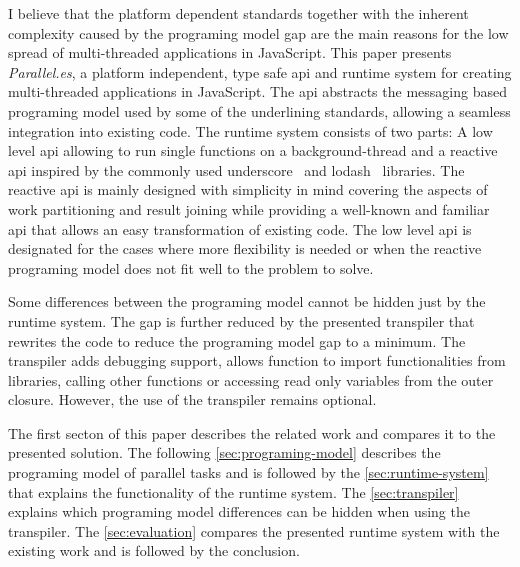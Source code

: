 I believe that the platform dependent standards together with the inherent complexity caused by the programing model gap are the main reasons for the low spread of multi-threaded applications in JavaScript. This paper presents \textit{Parallel.es}, a platform independent, type safe api and runtime system for creating multi-threaded applications in JavaScript. The api abstracts the messaging based programing model used by some of the underlining standards, allowing a seamless integration into existing code. The runtime system consists of two parts: A low level api allowing to run single functions on a background-thread and a reactive api inspired by the commonly used underscore~\cite{underscorejs} and lodash~\cite{lodash} libraries. The reactive api is mainly designed with simplicity in mind covering the aspects of work partitioning and result joining while providing a well-known and familiar api that allows an easy transformation of existing code. The low level api is designated for the cases where more flexibility is needed or when the reactive programing model does not fit well to the problem to solve. 

Some differences between the programing model cannot be hidden just by the runtime system. The gap is further reduced by the presented transpiler that rewrites the code to reduce the programing model gap to a minimum. The transpiler adds debugging support, allows function to import functionalities from libraries, calling other functions or accessing read only variables from the outer closure. However, the use of the transpiler remains optional. 


The first secton of this paper describes the related work and compares it to the presented solution. The following \cref{sec:programing-model} describes the programing model of parallel tasks and is followed by the \cref{sec:runtime-system} that explains the functionality of the runtime system. The \cref{sec:transpiler} explains which programing model differences can be hidden when using the transpiler. The \cref{sec:evaluation} compares the presented runtime system with the existing work and is followed by the conclusion. 